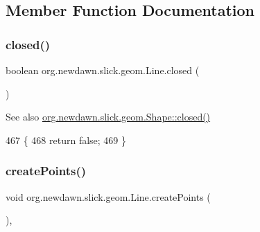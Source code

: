\subsection{Member Function Documentation}
\mbox{\label{classorg_1_1newdawn_1_1slick_1_1geom_1_1_line_aed50a12c5c8a2d860694107c0c126a70}} 
\subsubsection{\texorpdfstring{closed()}{closed()}}
{\footnotesize\ttfamily boolean org.\+newdawn.\+slick.\+geom.\+Line.\+closed (\begin{DoxyParamCaption}{ }\end{DoxyParamCaption})\hspace{0.3cm}{\ttfamily [inline]}}

\begin{DoxySeeAlso}{See also}
\mbox{\hyperlink{classorg_1_1newdawn_1_1slick_1_1geom_1_1_shape_a95d6725fbfa1ab9baff9bd721da82241}{org.\+newdawn.\+slick.\+geom.\+Shape\+::closed()}} 
\end{DoxySeeAlso}

\begin{DoxyCode}
467                             \{
468         \textcolor{keywordflow}{return} \textcolor{keyword}{false};
469     \}
\end{DoxyCode}
\mbox{\label{classorg_1_1newdawn_1_1slick_1_1geom_1_1_line_a3ccc2f47447f307bfcc6b640d03aee9d}} 
\subsubsection{\texorpdfstring{create\+Points()}{createPoints()}}
{\footnotesize\ttfamily void org.\+newdawn.\+slick.\+geom.\+Line.\+create\+Points (\begin{DoxyParamCaption}{ }\end{DoxyParamCaption})\hspace{0.3cm}{\ttfamily [inline]}, {\ttfamily [protected]}}

